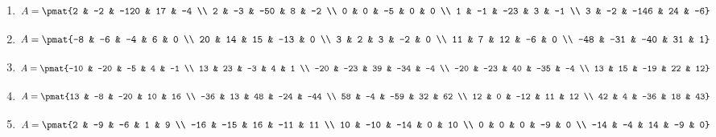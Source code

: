 \begin{enumerate}
\item

\begin{align*}
A = \pmat{2 & -2 & -120 & 17 & -4 \\ 2 & -3 & -50 & 8 & -2 \\ 0 & 0 & -5 & 0 & 0 \\ 1 & -1 & -23 & 3 & -1 \\ 3 & -2 & -146 & 24 & -6}
\end{align*}

\item

\begin{align*}
A = \pmat{-8 & -6 & -4 & 6 & 0 \\ 20 & 14 & 15 & -13 & 0 \\ 3 & 2 & 3 & -2 & 0 \\ 11 & 7 & 12 & -6 & 0 \\ -48 & -31 & -40 & 31 & 1}
\end{align*}

\item

\begin{align*}
A = \pmat{-10 & -20 & -5 & 4 & -1 \\ 13 & 23 & -3 & 4 & 1 \\ -20 & -23 & 39 & -34 & -4 \\ -20 & -23 & 40 & -35 & -4 \\ 13 & 15 & -19 & 22 & 12}
\end{align*}

\item

\begin{align*}
A = \pmat{13 & -8 & -20 & 10 & 16 \\ -36 & 13 & 48 & -24 & -44 \\ 58 & -4 & -59 & 32 & 62 \\ 12 & 0 & -12 & 11 & 12 \\ 42 & 4 & -36 & 18 & 43}
\end{align*}

\item

\begin{align*}
A = \pmat{2 & -9 & -6 & 1 & 9 \\ -16 & -15 & 16 & -11 & 11 \\ 10 & -10 & -14 & 0 & 10 \\ 0 & 0 & 0 & -9 & 0 \\ -14 & -4 & 14 & -9 & 0}
\end{align*}


\end{enumerate}

